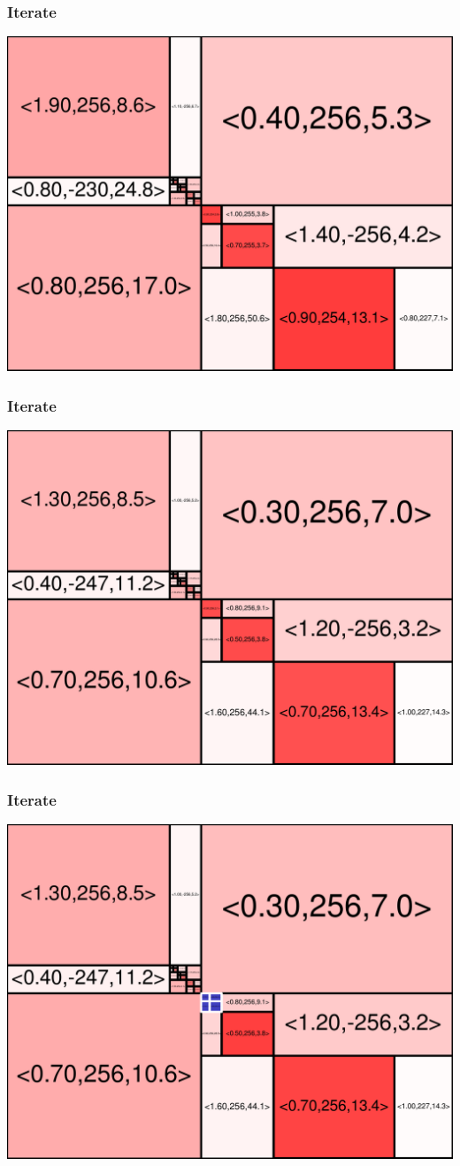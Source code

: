 \begin{frame}
\frametitle{Iterate}\begin{centering}\includegraphics[width=8.5 cm]{remy-graph/graph/test30.pdf}

\end{centering}\end{frame}


\begin{frame}
\frametitle{Iterate}\begin{centering}\includegraphics[width=8.5 cm]{remy-graph/graph/test31.pdf}

\end{centering}\end{frame}


\begin{frame}
\frametitle{Iterate}\begin{centering}\includegraphics[width=8.5 cm]{remy-graph/graph/test32.pdf}

\end{centering}\end{frame}



